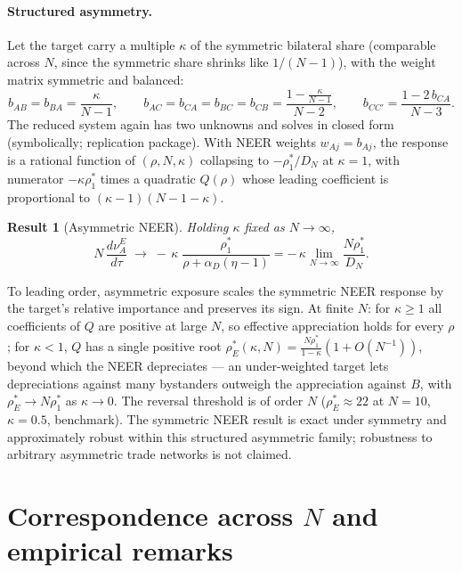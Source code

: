 \documentclass[11pt]{article}
\newtheorem{result}{Result}[section]
\begin{document}
\paragraph{Structured asymmetry.} Let the target carry a multiple $\kappa$ of the symmetric bilateral share (comparable across $N$, since the symmetric share shrinks like $1/(N-1)$), with the weight matrix symmetric and balanced:
\begin{equation}
b_{AB} = b_{BA} = \frac{\kappa}{N-1},
\qquad
b_{AC} = b_{CA} = b_{BC} = b_{CB} = \frac{1 - \frac{\kappa}{N-1}}{N-2},
\qquad
b_{CC'} = \frac{1 - 2\,b_{CA}}{N-3} .
\label{eq:kappa-b}
\end{equation}
The reduced system again has two unknowns and solves in closed form (symbolically; replication package). With NEER weights $w_{Aj} = b_{Aj}$, the response is a rational function of $(\rho, N, \kappa)$ collapsing to $-\rho_1^*/D_N$ at $\kappa = 1$, with numerator $-\kappa\rho_1^*$ times a quadratic $Q(\rho)$ whose leading coefficient is proportional to $(\kappa-1)(N-1-\kappa)$.

\begin{result}[Asymmetric NEER]
Holding $\kappa$ fixed as $N \to \infty$,
\begin{equation}
N\,\frac{d\nu_A^E}{d\tau}
\;\longrightarrow\;
-\,\kappa\;\frac{\rho_1^*}{\rho + \alpha_D(\eta-1)}
= -\,\kappa \lim_{N\to\infty}\frac{N\rho_1^*}{D_N} .
\label{eq:kappa-neer}
\end{equation}
\label{res:kappa}
\end{result}

\noindent To leading order, asymmetric exposure scales the symmetric NEER response by the target's relative importance and preserves its sign. At finite $N$: for $\kappa \geq 1$ all coefficients of $Q$ are positive at large $N$, so effective appreciation holds for every $\rho$; for $\kappa < 1$, $Q$ has a single positive root $\rho_E^*(\kappa, N) = \tfrac{N\rho_1^*}{1-\kappa}(1 + O(N^{-1}))$, beyond which the NEER depreciates --- an under-weighted target lets depreciations against many bystanders outweigh the appreciation against $B$, with $\rho_E^* \to N\rho_1^*$ as $\kappa \to 0$. The reversal threshold is of order $N$ ($\rho_E^* \approx 22$ at $N = 10$, $\kappa = 0.5$, benchmark). The symmetric NEER result is exact under symmetry and approximately robust within this structured asymmetric family; robustness to arbitrary asymmetric trade networks is not claimed.

\section{Correspondence across $N$ and empirical remarks}
\end{document}

